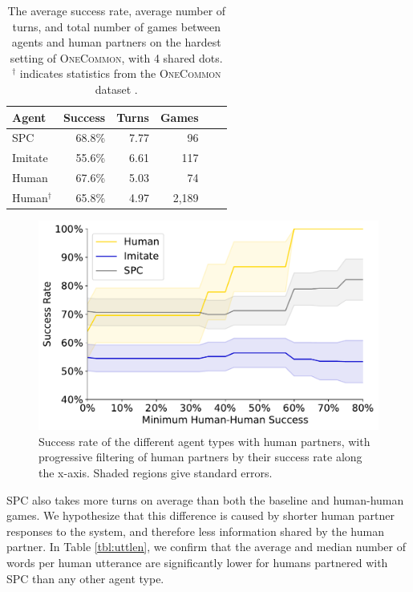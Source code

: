\documentclass[11pt]{article}
\newcommand{\system}{SPC}
\begin{document}
\begin{table}[!t]
\centering
\begin{tabular}{lrrrrr}
\toprule
Agent                   & Success & Turns & Games\\
\midrule
\system{}               & 68.8\%  & 7.77 & 96\\
Imitate                 & 55.6\%  & 6.61 & 117\\
Human                   & 67.6\%  & 5.03 & 74\\
\hline
Human$^\dagger$         & 65.8\%  & 4.97 & 2,189\\
\bottomrule
\end{tabular}
\caption{\label{tbl:human-eval}
The average success rate, average number of turns, and total number of games between agents and human partners on the hardest setting of \textsc{OneCommon}, with 4 shared dots.
$^\dagger$ indicates statistics from the \textsc{OneCommon} dataset \citep{onecommon}.
\vspace{1em}
}
\end{table}

\begin{figure}[!t]
\includegraphics[width=\columnwidth]{imgs/Figure_1.pdf}
\caption{
\label{fig:segmented_success}
Success rate of the different agent types with human partners, with progressive filtering of human partners by their success rate along the x-axis. Shaded regions give standard errors.
}
\end{figure}


\system{} also takes more turns on average than both the baseline and human-human games.
We hypothesize that this difference is caused by shorter human partner
responses to the system, and therefore less information shared by the human partner.
In Table \ref{tbl:uttlen}, we confirm that the average and median number of words per human utterance are significantly lower for humans partnered with \system{} than any other agent type.
\end{document}
